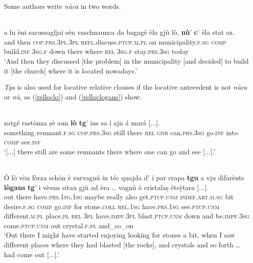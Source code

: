 Some authors write \textit{nùca} in two words.

\ea
{}\\
\gll    [...] a lu èni sacussagljai sén vaschnaunca da bagagè èla gjù lò, \textbf{nù}' \textbf{c}' èla stat oz. \\
     {} and then \textsc{cop.prs.3pl.3pl} \textsc{refl}.discuss.\textsc{ptcp.m.pl} on municipality.\textsc{f.sg} \textsc{comp} build.\textsc{inf} \textsc{3sg.f} down there where \textsc{rel} \textsc{3sg.f} stay.\textsc{prs.3sg} today\\
\glt `And then they discussed [the problem] in the municipality [and decided] to build it [the church] where it is located nowadays.'
\z

\textit{Tga} is also used for locative relative clauses if the locative antecedent is not \textit{nùca} or \textit{nù}, as (\ref{relloclo}) and (\ref{relloclogans}) show.

\ea
\label{relloclo}
\\
\gll [...] zatgé rastònza ṣè aun \textbf{lò} \textbf{tg}’ ins sa í ajn á mará [...].\\
 {} something remnant.\textsc{f.sg} \textsc{cop.prs.3sg} still there \textsc{rel} \textsc{gnr} can.\textsc{prs.3sg} go.\textsc{inf} into \textsc{comp} see.\textsc{inf}\\
\glt `[...] there still are some remnants there where one can go and see [...].'
\z

\ea
\label{relloclogans}
\\
\gll  Ò lò vòu fòrza schòn è survagnú in téc quajda d' í par crapa \textbf{tgu} a vju difarènts \textbf{lògans} \textbf{tg}’ i vèvan sitau gjù ad èra … vagnú ò cristalaṣ ètcè̱tara [...].   \\
out there  have.\textsc{prs.1sg.1sg} maybe really also get.\textsc{ptcp.unm} \textsc{indef.art.m.sg} bit desire.\textsc{f.sg} \textsc{comp} go.\textsc{inf} for stone.\textsc{coll} \textsc{rel.1sg} have.\textsc{prs.1sg} see.\textsc{ptcp.unm} different.\textsc{m.pl} place.\textsc{pl} \textsc{rel} \textsc{3pl} have.\textsc{impf.3pl} blast.\textsc{ptcp.unm} down and  be.\textsc{impf.3sg} {} come.\textsc{ptcp.unm} out crystal.\textsc{f.pl} and\_so\_on \\
\glt `Out there I might have started enjoying looking for stones a bit, when I saw different places where they had blasted [the rocks], and crystals and so forth … had come out [...].'
\z

